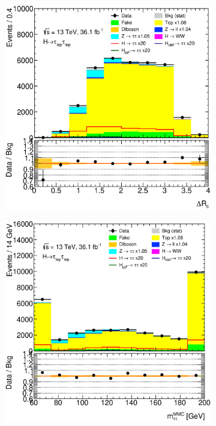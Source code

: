 \begin{figure}[htb]
    \centering
    \begin{subfigure}[t]{0.3\textwidth}
        \includegraphics[width=\textwidth]{./plots/mva/modeling/input_vars/BOOST_CR/ll-CutMVABoostedCatTopCR-DeltaRLL-lin.eps}
    \end{subfigure}
    \begin{subfigure}[t]{0.3\textwidth}
        \includegraphics[width=\textwidth]{./plots/mva/modeling/input_vars/BOOST_CR/ll-CutMVABoostedCatTopCR-dilep_mmc_mlm_m_ub-lin.eps}

\end{subfigure}
\end{figure}
